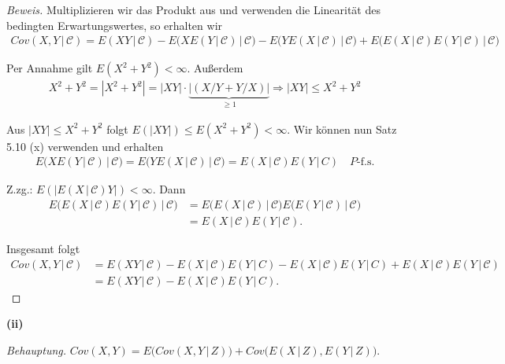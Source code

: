 \documentclass[10pt]{article}
\newcommand{\C}{\mathcal{C}}
\newcommand{\gap}{\,\vert\,}
\newcommand{\beh}{\textit{Behauptung. }}
\begin{document}
\begin{proof}[Beweis]  
	Multiplizieren wir das Produkt aus und verwenden die Linearität des bedingten Erwartungswertes, so erhalten wir
	\begin{align*}
		Cov(X,Y \gap \C) = E(XY \gap \C) - E\big(XE(Y \gap \C) \gap \C \big) - E\big(YE(X \gap \C) \gap \C \big) 
																			 + E\big( E(X \gap \C)E(Y \gap \C) \gap \C \big)
	\end{align*}

	Per Annahme gilt $E(X^2 + Y^2) < \infty$. Außerdem
	\begin{align*}
		X^2+Y^2 = |X^2+Y^2| = |XY|\cdot \underbrace{|(X/Y + Y/X)|}_{\geq 1} \Longrightarrow |XY| \leq X^2+Y^2 
	\end{align*} 

	Aus $|XY| \leq X^2+Y^2$ folgt $E(|XY|) \leq E(X^2 + Y^2) < \infty$. Wir können nun Satz 5.10 (x) verwenden und erhalten 
	\begin{align*}
		E\big(XE(Y \gap \C) \gap \C \big) = E\big(YE(X \gap \C) \gap \C \big) = E(X \gap \C) E(Y \gap C) \quad\text{$P$-f.s.}
	\end{align*}

	Z.zg.: $E(|E(X\gap \C)Y|) < \infty$. Dann 
	\begin{align*}
		E\big( E(X \gap \C)E(Y \gap \C) \gap \C \big) &= E\big( E(X \gap \C) \gap \C \big)E\big( E(Y \gap \C) \gap \C \big) \\
													  &= E(X \gap \C) E(Y \gap \C).
	\end{align*}

	Insgesamt folgt 
	\begin{align*}
		Cov(X,Y \gap \C) &= E(XY \gap \C) - E(X \gap \C) E(Y \gap C) - E(X \gap \C) E(Y \gap C) + E(X \gap \C) E(Y \gap \C) \\
						 &= E(XY \gap \C) - E(X \gap \C) E(Y \gap C).
	\end{align*}
\end{proof}

\newpage

\textbf{(ii)}

\beh $Cov(X,Y) = E\big(Cov(X,Y \gap Z)\big) + Cov\big(E(X \gap Z), E(Y \gap Z)\big)$.
\end{document}
